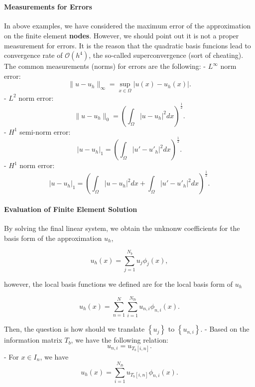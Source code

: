 \documentclass[11pt]{article}
\begin{document}
    \begin{center}
    \end{center}
    { \hspace*{\fill} \\}
    
    \paragraph{Measurements for Errors}\label{measurements-for-errors}

In above examples, we have considered the maximum error of the
approximation on the finite element \textbf{nodes}. However, we should
point out it is not a proper measurement for errors. It is the reason
that the quadratic basis funcions lead to convergence rate of
\(\mathcal{O}(h^4)\), the so-called superconvergence (sort of cheating).
The common measurements (norms) for errors are the following: -
\(L^\infty\) norm error:
\[ \|u - u_h\|_{\infty} =\sup\limits_{x\in \Omega}|u(x)- u_h(x)|. \] -
\(L^2\) norm error:
\[ \|u - u_h\|_{0} = \left(\int_{\Omega}|u - u_h|^2 dx\right)^{\frac{1}{2}}.\]
- \(H^1\) semi-norm error:
\[ |u - u_h|_{1} = \left(\int_{\Omega}|u' - u'_h|^2 dx\right)^{\frac{1}{2}}.\]
- \(H^1\) norm error:
\[ |u - u_h|_{1} = \left(\int_{\Omega}|u - u_h|^2 dx + \int_{\Omega}|u' - u'_h|^2 dx\right)^{\frac{1}{2}}.\]

    \paragraph{Evaluation of Finite Element
Solution}\label{evaluation-of-finite-element-solution}

By solving the final linear system, we obtain the unknonw coefficients
for the basis form of the approximation \(u_h\),

\begin{equation}
    u_h(x) = \sum\limits_{j = 1}^{N_b}u_j\phi_j(x),
\end{equation}

however, the local basis functions we defined are for the local basis
form of \(u_h\)

\begin{equation}
    u_h(x) = \sum\limits_{n = 1}^N\sum\limits_{i=1}^{N_{lb}}u_{n,i}\phi_{n,i}(x).
\end{equation}

Then, the question is how should we translate \(\left\{u_j\right\}\) to
\(\left\{u_{n,i}\right\}\). - Based on the information matrix \(T_b\),
we have the following relation: \[ u_{n,i} = u_{T_b[i,n]}.\] - For
\(x \in I_n\), we have
\[ u_h(x) = \sum\limits_{i=1}^{N_{lb}} u_{T_b[i,n]}\phi_{n,i}(x).\]
\end{document}
